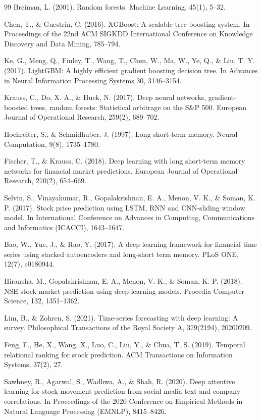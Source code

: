 \documentclass[10pt,a4paper,twocolumn]{article}
\begin{document}
\begin{thebibliography}{99}
 Breiman, L. (2001). Random forests. Machine Learning, 45(1), 5--32.

 Chen, T., \& Guestrin, C. (2016). XGBoost: A scalable tree boosting system. In Proceedings of the 22nd ACM SIGKDD International Conference on Knowledge Discovery and Data Mining, 785--794.

 Ke, G., Meng, Q., Finley, T., Wang, T., Chen, W., Ma, W., Ye, Q., \& Liu, T. Y. (2017). LightGBM: A highly efficient gradient boosting decision tree. In Advances in Neural Information Processing Systems 30, 3146--3154.

 Krauss, C., Do, X. A., \& Huck, N. (2017). Deep neural networks, gradient-boosted trees, random forests: Statistical arbitrage on the S\&P 500. European Journal of Operational Research, 259(2), 689--702.

 Hochreiter, S., \& Schmidhuber, J. (1997). Long short-term memory. Neural Computation, 9(8), 1735--1780.

 Fischer, T., \& Krauss, C. (2018). Deep learning with long short-term memory networks for financial market predictions. European Journal of Operational Research, 270(2), 654--669.

 Selvin, S., Vinayakumar, R., Gopalakrishnan, E. A., Menon, V. K., \& Soman, K. P. (2017). Stock price prediction using LSTM, RNN and CNN-sliding window model. In International Conference on Advances in Computing, Communications and Informatics (ICACCI), 1643--1647.

 Bao, W., Yue, J., \& Rao, Y. (2017). A deep learning framework for financial time series using stacked autoencoders and long-short term memory. PLoS ONE, 12(7), e0180944.

 Hiransha, M., Gopalakrishnan, E. A., Menon, V. K., \& Soman, K. P. (2018). NSE stock market prediction using deep-learning models. Procedia Computer Science, 132, 1351--1362.

 Lim, B., \& Zohren, S. (2021). Time-series forecasting with deep learning: A survey. Philosophical Transactions of the Royal Society A, 379(2194), 20200209.

 Feng, F., He, X., Wang, X., Luo, C., Liu, Y., \& Chua, T. S. (2019). Temporal relational ranking for stock prediction. ACM Transactions on Information Systems, 37(2), 27.

 Sawhney, R., Agarwal, S., Wadhwa, A., \& Shah, R. (2020). Deep attentive learning for stock movement prediction from social media text and company correlations. In Proceedings of the 2020 Conference on Empirical Methods in Natural Language Processing (EMNLP), 8415--8426.


\end{thebibliography}
\end{document}
